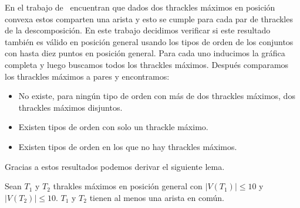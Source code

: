 En el trabajo de~\cite{Fabila-Monroy2018}
encuentran que dados dos thrackles máximos en posición convexa estos comparten
una arista y esto se cumple para cada par de thrackles de la descomposición.
En este trabajo decidimos verificar si este resultado también es válido en
posición general usando los tipos de orden de los conjuntos
con hasta diez puntos en posición general. Para cada uno
inducimos la gráfica completa y luego buscamos todos los thrackles máximos.
Después comparamos los thrackles máximos a pares y encontramos:
\begin{itemize}
  \item No existe, para ningún tipo de orden con más de dos thrackles máximos, dos thrackles máximos disjuntos.
  \item Existen tipos de orden con solo un thrackle máximo.
  \item Existen tipos de orden en los que no hay thrackles máximos.
\end{itemize}

Gracias a estos resultados podemos derivar el siguiente lema.
\begin{lemma}\label{lema:thdisjuntos}
  Sean $T_1$ y $T_2$ thrakles máximos en posición general con $|V(T_1)|\leq 10$
  y $|V(T_2)|\leq 10$. $T_1$ y $T_2$ tienen al menos una arista en común.
\end{lemma}


